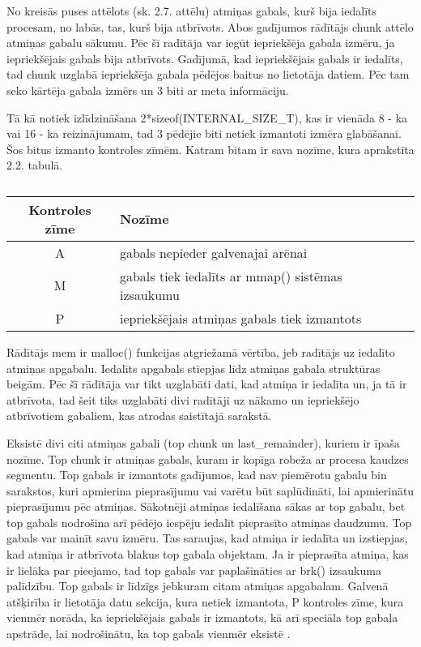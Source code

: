 No kreisās puses attēlots (sk. 2.7. attēlu) \cite{MALLOC} atmiņas gabals, kurš bija iedalīts procesam, no labās, tas, kurš bija atbrīvots.
Abos gadījumos rādītājs chunk attēlo atmiņas gabalu sākumu. Pēc šī radītāja var iegūt iepriekšēja gabala izmēru, ja iepriekšējais gabals bija atbrīvots.
Gadījumā, kad iepriekšējais gabals ir iedalīts, tad chunk uzglabā iepriekšēja gabala pēdējos baitus no lietotāja datiem. 
Pēc tam seko kārtēja gabala izmērs un 3 biti ar meta informāciju. 



Tā kā notiek izlīdzināšana 2*sizeof(INTERNAL\_SIZE\_T), kas ir vienāda 8 - ka vai 16 - ka  reizinājumam, tad 3 pēdējie biti netiek izmantoti izmēra glabāšanai. 
Šos bitus izmanto kontroles zīmēm. Katram bitam ir sava nozīme, kura aprakstīta 2.2. tabulā.

  \begin{table}[H]
\caption{\textbf{\fontsize{11}{12}\selectfont {\\ Atmiņas gabala kontroles zīmes}}} 
\label{table:kysymys}
\centering
	\begin{tabular}{|c|l|r|p{5cm}|}
	  \hline
	Kontroles zīme & Nozīme \\
	\hline
	  A & gabals nepieder galvenajai arēnai \\
      \hline
      M & gabals tiek iedalīts ar mmap() sistēmas izsaukumu \\
      \hline
      P & iepriekšējais atmiņas gabals tiek izmantots  \\
    \hline
	\end{tabular}
\end{table}

Rādītājs mem ir malloc() funkcijas atgriežamā vērtība, jeb radītājs uz iedalīto atmiņas apgabalu. Iedalīts apgabals stiepjas līdz atmiņas gabala struktūras beigām.
Pēc šī rādītāja var tikt uzglabāti dati, kad atmiņa ir iedalīta un, ja tā ir atbrīvota, tad šeit tiks uzglabāti divi radītāji uz nākamo un iepriekšējo atbrīvotiem gabaliem, kas atrodas saistītajā sarakstā. 


Eksistē divi citi atmiņas gabali (top chunk un last\_remainder), kuriem ir īpaša nozīme. 
Top chunk ir atmiņas gabals, kuram ir kopīga robeža ar procesa kaudzes segmentu.
Top gabals ir izmantots gadījumos, kad nav piemērotu gabalu bin sarakstos, kuri apmierina pieprasījumu vai varētu būt saplūdināti, lai apmierinātu pieprasījumu pēc atmiņas.
Sākotnēji atmiņas iedalīšana sākas ar top gabalu, bet top gabals nodrošina arī pēdējo iespēju iedalīt pieprasīto atmiņas daudzumu.
Top gabals var mainīt savu izmēru. Tas saraujas, kad atmiņa ir iedalīta un izstiepjas, kad atmiņa ir atbrīvota blakus top gabala objektam. 
Ja ir pieprasīta atmiņa, kas ir lielāka par pieejamo, tad top gabals var paplašināties ar brk() izsaukuma palīdzību.
Top gabals ir līdzīgs jebkuram citam atmiņas apgabalam. 
Galvenā atšķirība ir lietotāja datu sekcija, kura netiek izmantota, P kontroles zīme, kura vienmēr norāda, ka iepriekšējais gabals ir izmantots, kā arī speciāla top gabala apstrāde, lai nodrošinātu, ka top gabals vienmēr eksistē \cite {MALLOC}.

